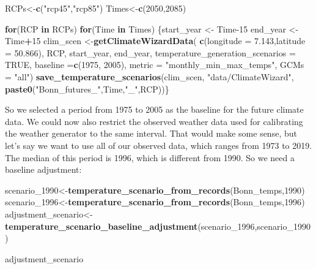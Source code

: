 \documentclass[
]{book}
\newenvironment{Shaded}{\begin{snugshade}}{\end{snugshade}}
\newcommand{\ControlFlowTok}[1]{\textcolor[rgb]{0.13,0.29,0.53}{\textbf{#1}}}
\newcommand{\DataTypeTok}[1]{\textcolor[rgb]{0.13,0.29,0.53}{#1}}
\newcommand{\DecValTok}[1]{\textcolor[rgb]{0.00,0.00,0.81}{#1}}
\newcommand{\FloatTok}[1]{\textcolor[rgb]{0.00,0.00,0.81}{#1}}
\newcommand{\KeywordTok}[1]{\textcolor[rgb]{0.13,0.29,0.53}{\textbf{#1}}}
\newcommand{\NormalTok}[1]{#1}
\newcommand{\OperatorTok}[1]{\textcolor[rgb]{0.81,0.36,0.00}{\textbf{#1}}}
\newcommand{\OtherTok}[1]{\textcolor[rgb]{0.56,0.35,0.01}{#1}}
\newcommand{\StringTok}[1]{\textcolor[rgb]{0.31,0.60,0.02}{#1}}
\begin{document}
\begin{Shaded}
\begin{Highlighting}[]
\NormalTok{RCPs<-}\KeywordTok{c}\NormalTok{(}\StringTok{"rcp45"}\NormalTok{,}\StringTok{"rcp85"}\NormalTok{)}
\NormalTok{Times<-}\KeywordTok{c}\NormalTok{(}\DecValTok{2050}\NormalTok{,}\DecValTok{2085}\NormalTok{)}

\ControlFlowTok{for}\NormalTok{(RCP }\ControlFlowTok{in}\NormalTok{ RCPs)}
  \ControlFlowTok{for}\NormalTok{(Time }\ControlFlowTok{in}\NormalTok{ Times)}
\NormalTok{    \{start_year <-}\StringTok{ }\NormalTok{Time}\DecValTok{-15}
\NormalTok{    end_year <-}\StringTok{ }\NormalTok{Time}\OperatorTok{+}\DecValTok{15}
\NormalTok{    clim_scen <-}\KeywordTok{getClimateWizardData}\NormalTok{(}
      \KeywordTok{c}\NormalTok{(}\DataTypeTok{longitude =} \FloatTok{7.143}\NormalTok{,}\DataTypeTok{latitude =} \FloatTok{50.866}\NormalTok{),}
\NormalTok{      RCP,}
\NormalTok{      start_year,}
\NormalTok{      end_year,}
      \DataTypeTok{temperature_generation_scenarios =} \OtherTok{TRUE}\NormalTok{,}
      \DataTypeTok{baseline =}\KeywordTok{c}\NormalTok{(}\DecValTok{1975}\NormalTok{, }\DecValTok{2005}\NormalTok{),}
      \DataTypeTok{metric =} \StringTok{"monthly_min_max_temps"}\NormalTok{,}
      \DataTypeTok{GCMs =} \StringTok{"all"}\NormalTok{)}
    \KeywordTok{save_temperature_scenarios}\NormalTok{(clim_scen,}
                               \StringTok{"data/ClimateWizard"}\NormalTok{,}
                               \KeywordTok{paste0}\NormalTok{(}\StringTok{"Bonn_futures_"}\NormalTok{,Time,}\StringTok{"_"}\NormalTok{,RCP))\}}
\end{Highlighting}
\end{Shaded}

So we selected a period from 1975 to 2005 as the baseline for the future climate data. We could now also restrict the observed weather data used for calibrating the weather generator to the same interval. That would make some sense, but let's say we want to use all of our observed data, which ranges from 1973 to 2019. The median of this period is 1996, which is different from 1990. So we need a baseline adjustment:

\begin{Shaded}
\begin{Highlighting}[]
\NormalTok{scenario_}\DecValTok{1990}\NormalTok{<-}\KeywordTok{temperature_scenario_from_records}\NormalTok{(Bonn_temps,}\DecValTok{1990}\NormalTok{)}
\NormalTok{scenario_}\DecValTok{1996}\NormalTok{<-}\KeywordTok{temperature_scenario_from_records}\NormalTok{(Bonn_temps,}\DecValTok{1996}\NormalTok{)}
\NormalTok{adjustment_scenario<-}\KeywordTok{temperature_scenario_baseline_adjustment}\NormalTok{(scenario_}\DecValTok{1996}\NormalTok{,scenario_}\DecValTok{1990}\NormalTok{)}

\NormalTok{adjustment_scenario}
\end{Highlighting}
\end{Shaded}
\end{document}
